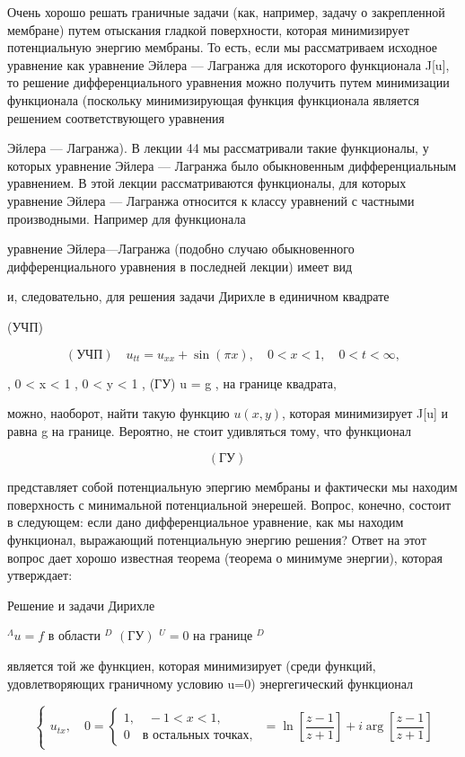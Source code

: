 \documentclass[
  ukrainian,
]{article}
\begin{document}
Очень хорошо решать граничные задачи (как, например, задачу о
закрепленной мембране) путем отыскания гладкой поверхности, которая
минимизирует потенциальную энергию мембраны. То есть, если мы
рассматриваем исходное уравнение как уравнение Эйлера --- Лагранжа для
искоторого функционала J{[}u{]}, то решение дифференциального уравнения
можно получить путем минимизации функционала (поскольку минимизирующая
функция функционала является решением соответствующего уравнения

Эйлера --- Лагранжа). В лекции 44 мы рассматривали такие функционалы, у
которых уравнение Эйлера --- Лагранжа было обыкновенным дифференциальным
уравнением. В этой лекции рассматриваются функционалы, для которых
уравнение Эйлера --- Лагранжа относится к классу уравнений с частными
производными. Например для функционала

уравнение Эйлера---Лагранжа (подобно случаю обыкновенного
дифференциального уравнения в последней лекции) имеет вид

и, следовательно, для решения задачи Дирихле в единичном квадрате

(УЧП)

\[
(\text{УЧП}) \quad u_{tt} = u_{xx} + \sin(\pi x), \quad 0 < x < 1, \quad 0 < t < \infty,
\]

, 0 \textless{} x \textless{} 1 , 0 \textless{} y \textless{} 1 , (ГУ) u
= g , на границе квадрата,

можно, наоборот, найти такую функцию \(u(x, y)\), которая минимизирует
J{[}u{]} и равна g на границе. Вероятно, не стоит удивляться тому, что
функционал

\[
(\text{ГУ}) \quad
\]

представляет собой потенциальную эпергию мембраны и фактически мы
находим поверхность с минимальной потенциальной энерешей. Вопрос,
конечно, состоит в следующем: если дано дифференциальное уравнение, как
мы находим функционал, выражающий потенциальную энергию решения? Ответ
на этот вопрос дает хорошо известная теорема (теорема о минимуме
энергии), которая утверждает:

Решение и задачи Дирихле

\(^{\Lambda}u = f\) в области \(^{D}\) \((ГУ)\) \(^{U}=0\) на границе
\(^{D}\)

является той же функциен, которая минимизирует (среди функций,
удовлетворяющих граничному условию u=0) энергегический функционал

\[
\begin{cases} u_{tx}, \quad 0 = \begin{cases} 1, \quad -1 < x < 1, \\ 0 \quad \text{в остальных точках,} \end{cases} \end{cases}
= \ln\left[\frac{z-1}{z+1}\right] + i \arg\left[\frac{z-1}{z+1}\right]
\]
\end{document}
